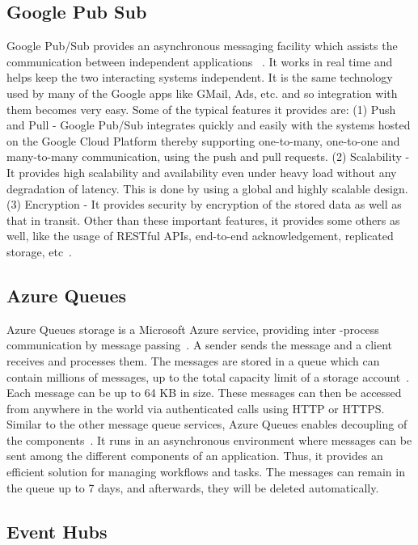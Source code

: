 \subsection{Google Pub Sub}

Google Pub/Sub provides an asynchronous messaging facility which
assists the communication between independent applications
~\cite{www-google-pub-sub}. It works in real time and helps keep the
two interacting systems independent. It is the same technology used by
many of the Google apps like GMail, Ads, etc. and so integration with
them becomes very easy.  Some of the typical features it provides are:
(1) Push and Pull - Google Pub/Sub integrates quickly and easily with
the systems hosted on the Google Cloud Platform thereby supporting
one-to-many, one-to-one and many-to-many communication, using the push
and pull requests. (2) Scalability - It provides high scalability and
availability even under heavy load without any degradation of
latency. This is done by using a global and highly scalable
design. (3) Encryption - It provides security by encryption of the
stored data as well as that in transit. Other than these important
features, it provides some others as well, like the usage of RESTful
APIs, end-to-end acknowledgement, replicated storage,
etc~\cite{www-google-pub-sub-features}.
     
\subsection{Azure Queues}

Azure Queues storage is a Microsoft Azure service, providing inter
-process communication by message
passing~\cite{silberschatz1998operating}.  A sender sends the message
and a client receives and processes them.  The messages are stored in
a queue which can contain millions of messages, up to the total
capacity limit of a storage account~\cite{www-azurequeue-web}.  Each
message can be up to 64 KB in size. These messages can then be
accessed from anywhere in the world via authenticated calls using HTTP
or HTTPS. Similar to the other message queue services, Azure Queues
enables decoupling of the components~\cite{www-tutorialspoint}. It
runs in an asynchronous environment where messages can be sent among
the different components of an application. Thus, it provides an
efficient solution for managing workflows and tasks. The messages can
remain in the queue up to 7 days, and afterwards, they will be deleted
automatically.

\subsection{Event Hubs}

